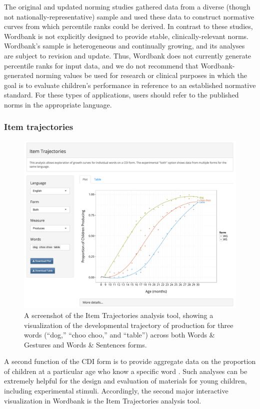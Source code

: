 \documentclass[doc,noapacite]{apa2}
\begin{document}
The original and updated norming studies \cite{fenson1994,fenson2007} gathered data from a diverse (though not nationally-representative) sample and used these data to construct normative curves from which percentile ranks could be derived. In contrast to these studies, Wordbank is not explicitly designed to provide stable, clinically-relevant norms. Wordbank's sample is heterogeneous and continually growing, and its analyses are subject to revision and update. Thus, Wordbank does not currently generate percentile ranks for input data, and we do not recommend that Wordbank-generated norming values be used for research or clinical purposes in which the goal is to evaluate children's performance in reference to an established normative standard. For these types of applications, users should refer to the published norms in the appropriate language. 

\subsubsection{Item trajectories}

\begin{figure}[t]
\includegraphics[width=6in]{figures/itemsapp.png}
\caption{\label{fig:items} A screenshot of the Item Trajectories analysis tool, showing a visualization of the developmental trajectory of production for three words (``dog,'' ``choo choo,'' and ``table'') across both Words \& Gestures and Words \& Sentences forms.}
\end{figure}

A second function of the CDI form is to provide aggregate data on the proportion of children at a particular age who know a specific word \cite{dale1996,jorgensen2010}. Such analyses can be extremely helpful for the design and evaluation of materials for young children, including experimental stimuli. Accordingly, the second major interactive visualization in Wordbank is the Item Trajectories analysis tool. 
\end{document}
